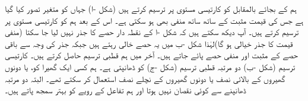 ہم  کے بجائے  بالمقابل  کو کارتیسی  مستوی پر ترسیم کرتے ہیں (شکل -ا) جہاں  کو متغیر تصور کیا گیا ہے جس کی قیمت مثبت کے ساتھ ساتھ منفی بھی ہو سکتی ہے۔ اس کے بعد ہم  کو کارتیسی  مستوی پر ترسیم کرتے ہیں۔ آپ دیکھ سکتے ہیں کہ شکل -ا کے نقطہ دار حصے کا جذر نہیں لیا جا سکتا  (منفی قیمت کا جذر خیالی ہو گا)لہٰذا شکل -ب میں یہ حصے خالی رہتے ہیں جبکہ جذر کی وجہ سے باقی حصے کے مثبت اور منفی حصے پائے جاتے ہیں۔  آخر میں ہم قطبی ترسیم حاصل کرتے ہیں۔ کارتیسی ترسیم (شکل -ب) دو  مرتبہ  قطبی ترسیم (شکل -ج) کو ڈھانپتی ہے۔ ہم کسی ایک گھیرا کو، یا دونوں گھیروں کے بالائی نصف یا دونوں  گھیروں کے نچلے نصف  استعمال کر سکتے تھے۔ البتہ دو  مرتبہ  ڈھانپنے سے کوئی نقصان نہیں ہوتا  اور ہم تفاعل کے رویے کو بہتر سمجھ پاتے ہیں۔
